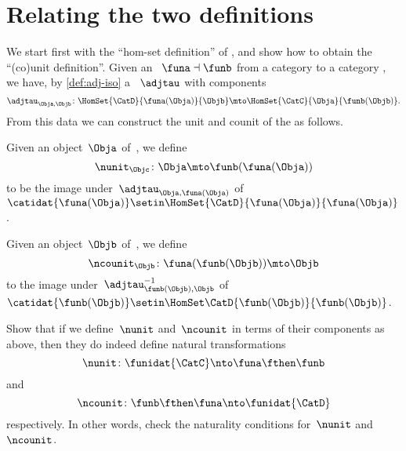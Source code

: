 
\section{Relating the two definitions}
\label{relate-adj-defs}

We start first with the ``hom-set definition'' of , and show how to obtain the ``(co)unit definition''.
Given an ~$\funa \dashv \funb$ from a category \CatC to a category \CatD, we have, by \cref{def:adj-iso} a ~$\adjtau$ with components
\begin{equation}
    \adjtau_{\Obja,\Objb} \colon \HomSet{\CatD}{\funa(\Obja)}{\Objb} \mto \HomSet{\CatC}{\Obja}{\funb(\Objb)}.
\end{equation}
From this data we can construct the unit and counit of the  as follows.

Given an object~$\Obja$ of~\CatC, we define
%
\begin{equation}
    \nunit_\Objc \colon \Obja \mto \funb(\funa(\Obja))
\end{equation}
%
to be the image under~$\adjtau_{\Obja, \funa(\Obja)}$ of~$\catidat{\funa(\Obja)} \setin \HomSet{\CatD}{\funa (\Obja)}{\funa(\Obja)}$.

Given an object~$\Objb$ of~\CatD, we define
\begin{equation}
    \ncounit_\Objb \colon \funa(\funb(\Objb)) \mto \Objb
\end{equation}
to the image under~$\adjtau_{\funb(\Objb), \Objb}^{-1}$ of~$\catidat{\funb(\Objb)} \setin \HomSet\CatD{\funb(\Objb)}{\funb(\Objb)}$.

\begin{exercise}
    \label{ex:eta-epsilon}

    Show that if we define~$\nunit$ and~$\ncounit$ in terms of their components as above, then they do indeed define natural transformations
    \begin{equation}
        \nunit\colon \funidat{\CatC} \nto \funa \fthen \funb
    \end{equation}
    and
    \begin{equation}
        \ncounit\colon \funb \fthen \funa \nto \funidat{\CatD}
    \end{equation}
    respectively.
    In other words, check the naturality conditions for~$\nunit$ and~$\ncounit$.
\end{exercise}

